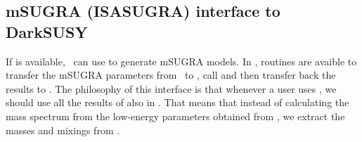 
\subsection{mSUGRA (ISASUGRA) interface to DarkSUSY}

If  is available, \ds\ can use  to
generate mSUGRA models. In , routines are avaible to
transfer the mSUGRA parameters from \ds\ to , call
 and then transfer back the results to \ds. The
philosophy of this interface is that whenever a user uses
, we should use all the results of  also
in \ds. That means that instead of calculating the mass spectrum from
the low-energy parameters obtained from , we extract
the masses and mixings from .
